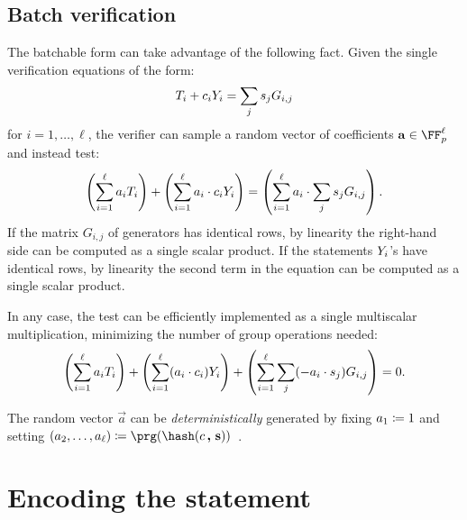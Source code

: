 \documentclass[11pt]{article}
\begin{document}
\subsection{Batch verification}

The batchable form can take advantage of the following fact.
Given the single verification equations of the form:
\[
   T_i + c_i Y_i = \sum_j s_j G_{i,j}
\]
for $i=1, \dots,\ell$,
the verifier can sample a random vector of coefficients $\vec a \in \FF_p^\ell$ and instead test:
\[
  \left(\sum_{i=1}^{\ell} a_i T_i\right) + \left(\sum_{i=1}^{\ell} a_i \cdot  c_i Y_i \right) = \left(\sum_{i=1}^{\ell} a_i \cdot \sum_j s_j G_{i,j}\right).
\]
If the matrix $G_{i, j}$ of generators has identical rows, by linearity the right-hand side can be computed as a single scalar product.
If the statements $Y_i$'s have identical rows, by linearity the second term in the equation can be computed as a single scalar product.

In any case, the test can be efficiently implemented as a single multiscalar multiplication, minimizing the number of group operations needed:
\[
  \left(\sum_{i=1}^{\ell} a_i T_i\right) + \left(\sum_{i=1}^{\ell} (a_i \cdot  c_i) Y_i \right) + \left(\sum_{i=1}^{\ell}\sum_j (-a_i \cdot  s_j) G_{i,j}\right) = 0.
\]

The random vector $\vec a$ can be \emph{deterministically} generated by fixing $a_1 \coloneqq 1$ and setting $(a_2, \dots, a_{\ell}) \defeq \prg(\hash(\challenge \concat \vec s))$~\cite{bip-schnorr}.


\section{Encoding the statement}
\end{document}
